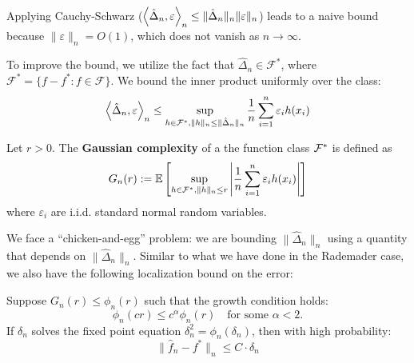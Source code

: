 \begin{remark}
    Applying Cauchy-Schwarz ($\left\langle \hat{\Delta}_n, \varepsilon \right\rangle_n \leq \|\hat{\Delta}_n\|_n \|\varepsilon\|_n$) leads to a naive bound because $\|\varepsilon\|_n = O(1)$, which does not vanish as $n \to \infty$.
\end{remark}


To improve the bound, we utilize the fact that $\hat{\Delta}_n \in \mathcal{F}^*$, where $\mathcal{F}^* = \{ f - f^* : f \in \mathcal{F} \}$. We bound the inner product uniformly over the class:
$$ \left\langle \hat{\Delta}_n, \varepsilon \right\rangle_n \leq \sup_{h \in \mathcal{F}^*, \|h\|_n \leq \|\hat{\Delta}_n\|_n} \frac{1}{n} \sum_{i=1}^n \varepsilon_i h(x_i) $$

\begin{de} Let $r>0$. The \textbf{Gaussian complexity} of a the function class $\mathcal{F}^*$ is defined as
$$ G_n(r) := \mathbb{E} \left[ \sup_{h \in \mathcal{F}^*, \|h\|_n \leq r} \left| \frac{1}{n} \sum_{i=1}^n \varepsilon_i h(x_i) \right| \right] $$
where $\varepsilon_i$ are i.i.d. standard normal random variables.
\end{de}

We face a ``chicken-and-egg'' problem: we are bounding $\|\hat{\Delta}_n\|_n$ using a quantity that depends on $\|\hat{\Delta}_n\|_n$. Similar to what we have done in the Rademader case, we also have the following localization bound on the error:

\begin{thm}
Suppose $G_n(r) \leq \phi_n(r)$ such that the growth condition holds:
$$ \phi_n(cr) \leq c^\alpha \phi_n(r) \quad \text{for some } \alpha < 2. $$
If $\delta_n$ solves the fixed point equation $\delta_n^2 = \phi_n(\delta_n)$, then with high probability:
$$ \|\hat{f}_n - f^*\|_n \leq C \cdot \delta_n $$
\end{thm}

